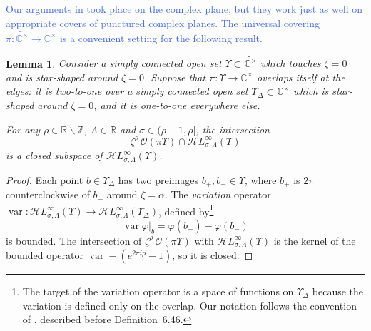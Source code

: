\documentclass{article}
\newcommand{\singexp}[2]{\mathcal{H}L^\infty_{#1, #2}}
\newcommand{\maps}{\colon}
\newcommand{\Z}{\mathbb{Z}}
\newcommand{\R}{\mathbb{R}}
\newcommand{\C}{\mathbb{C}}
\DeclareMathOperator{\var}{var}
\theoremstyle{definition}
\theoremstyle{plain}
\newtheorem{lemma}[definition]{Lemma}
\begin{document}
\textcolor{RoyalBlue}{Our arguments in \cite{reg-sing-volterra} took place on the complex plane, but they work just as well on appropriate covers of punctured complex planes. The universal covering $\pi \maps \widetilde{\C^\times} \to \C^\times$ is a convenient setting for the following result.}

\begin{lemma}\label{lem:shifted_holo_closed}
Consider a simply connected open set $\Upsilon \subset \widetilde{\C^\times}$ which touches $\zeta = 0$ and is star-shaped around $\zeta = 0$. Suppose that $\pi \maps \Upsilon \to \C^\times$ overlaps itself at the edges: it is two-to-one over a simply connected open set $\Upsilon_\Delta \subset \C^\times$ which is star-shaped around $\zeta = 0$, and it is one-to-one everywhere else.
\begin{center}
\end{center}
For any $\rho \in \R \smallsetminus \Z$, $\Lambda \in \R$ and $\sigma \in (\rho-1, \rho]$, the intersection
\[ \zeta^\rho\,\mathcal{O}(\pi \Upsilon) \cap \singexp{\sigma}{\Lambda}(\Upsilon) \]
is a closed subspace of $\singexp{\sigma}{\Lambda}(\Upsilon)$.
\end{lemma}
\begin{proof}
Each point $b \in \Upsilon_\Delta$ has two preimages $b_+, b_- \in \Upsilon$, where $b_+$ is $2\pi$ counterclockwise of $b_-$ around $\zeta = \alpha$. The {\em variation} operator $\var \maps \singexp{\sigma}{\Lambda}(\Upsilon) \to \singexp{\sigma}{\Lambda}(\Upsilon_\Delta)$, defined by\footnote{The target of the variation operator is a space of functions on $\Upsilon_\Delta$ because the variation is defined only on the overlap. Our notation follows the convention of \cite{diverg-resurg-i}, described before Definition~6.46.}
\[ \var \varphi \big|_b = \varphi(b_+) - \varphi(b_-) \]
is bounded. The intersection of $\zeta^\rho\,\mathcal{O}(\pi\Upsilon)$ with $\singexp{\sigma}{\Lambda}(\Upsilon)$ is the kernel of the bounded operator $\var - (e^{2\pi i \rho} - 1)$, so it is closed.
\end{proof}
\end{document}
